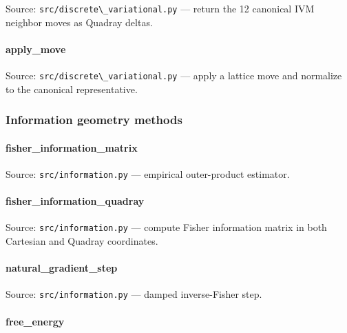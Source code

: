 \documentclass[
  10pt,
]{article}
\newcommand{\passthrough}[1]{#1}
\renewcommand{\texttt}[1]{%
    \colorbox{codebg}{\color{codefg}\ttfamily #1}%
}
\begin{document}
Source: \passthrough{\lstinline!src/discrete\_variational.py!} ---
return the 12 canonical IVM neighbor moves as Quadray deltas.

\hypertarget{code:apply_move}{%
\paragraph{\texorpdfstring{\texttt{apply\_move}}{apply\_move}}\label{code:apply_move}}

Source: \passthrough{\lstinline!src/discrete\_variational.py!} --- apply
a lattice move and normalize to the canonical representative.

\hypertarget{code:information_geometry}{%
\subsubsection{Information geometry
methods}\label{code:information_geometry}}

\hypertarget{code:fisher_information_matrix}{%
\paragraph{\texorpdfstring{\texttt{fisher\_information\_matrix}}{fisher\_information\_matrix}}\label{code:fisher_information_matrix}}

Source: \passthrough{\lstinline!src/information.py!} --- empirical
outer-product estimator.

\hypertarget{code:fisher_information_quadray}{%
\paragraph{\texorpdfstring{\texttt{fisher\_information\_quadray}}{fisher\_information\_quadray}}\label{code:fisher_information_quadray}}

Source: \passthrough{\lstinline!src/information.py!} --- compute Fisher
information matrix in both Cartesian and Quadray coordinates.

\hypertarget{code:natural_gradient_step}{%
\paragraph{\texorpdfstring{\texttt{natural\_gradient\_step}}{natural\_gradient\_step}}\label{code:natural_gradient_step}}

Source: \passthrough{\lstinline!src/information.py!} --- damped
inverse-Fisher step.

\hypertarget{code:free_energy}{%
\paragraph{\texorpdfstring{\texttt{free\_energy}}{free\_energy}}\label{code:free_energy}}
\end{document}
